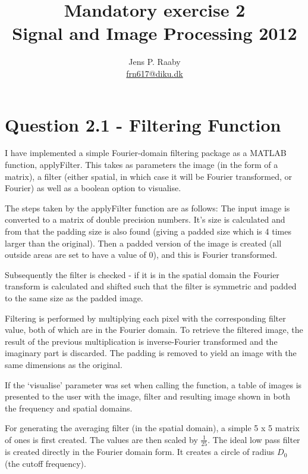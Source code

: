 \documentclass{article}
\title{Mandatory exercise 2 \\ Signal and Image Processing 2012}
\author{Jens P. Raaby \\
\url{frn617@diku.dk}}
\begin{document}
\maketitle

\section*{Question 2.1 - Filtering Function}
I have implemented a simple Fourier-domain filtering package as a MATLAB function, applyFilter. This takes as parameters the image (in the form of a matrix), a filter (either spatial, in which case it will be Fourier transformed, or Fourier)  as well as a boolean option to visualise.

The steps taken by the applyFilter function are as follows:
The input image is converted to a matrix of double precision numbers. It's size is calculated and from that the padding size is also found (giving a padded size which is 4 times larger than the original). Then a padded version of the image is created (all outside areas are set to have a value of 0), and this is Fourier transformed.

Subsequently the filter is checked - if it is in the spatial domain the Fourier transform is calculated and shifted such that the filter is symmetric and padded to the same size as the padded image. 

Filtering is performed by multiplying each pixel with the corresponding filter value, both of which are in the Fourier domain. To retrieve the filtered image, the result of the previous multiplication is inverse-Fourier transformed and the imaginary part is discarded. The padding is removed to yield an image with the same dimensions as the original.

If the `visualise' parameter was set when calling the function, a table of images is presented to the user with the image, filter and resulting image shown in both the frequency and spatial domains.

For generating the averaging filter (in the spatial domain), a simple 5 x 5 matrix of ones is first created. The values are then scaled by $\frac 1 {25}$. The ideal low pass filter is created directly in the Fourier domain form. It creates a circle of radius $D_0$ (the cutoff frequency).
\end{document}
